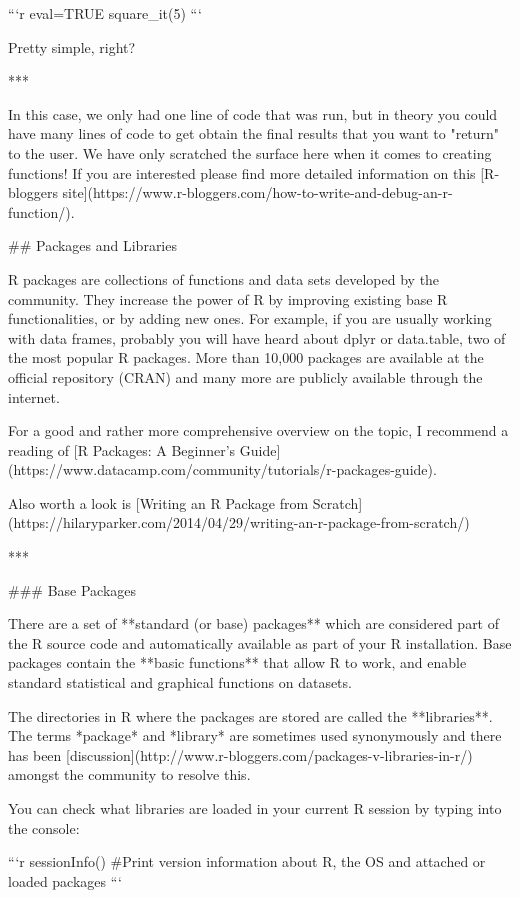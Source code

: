{{```{r eval=TRUE}
square_it(5)
```

Pretty simple, right? 

***

In this case, we only had one line of code that was run, but in theory you could have many lines of code to get obtain the final results that you want to "return" to the user. We have only scratched the surface here when it comes to creating functions! If you are interested please find more detailed information on this [R-bloggers site](https://www.r-bloggers.com/how-to-write-and-debug-an-r-function/).

## Packages and Libraries

R packages are collections of functions and data sets developed by the community. They increase the power of R by improving existing base R functionalities, or by adding new ones. For example, if you are usually working with data frames, probably you will have heard about dplyr or data.table, two of the most popular R packages. More than 10,000 packages are available at the official repository (CRAN) and many more are publicly available through the internet.

For a good and rather more comprehensive overview on the topic, I recommend a reading of [R Packages: A Beginner's Guide](https://www.datacamp.com/community/tutorials/r-packages-guide).

Also worth a look is [Writing an R Package from Scratch](https://hilaryparker.com/2014/04/29/writing-an-r-package-from-scratch/)

***

### Base Packages

There are a set of **standard (or base) packages** which are considered part of the R source code and automatically available as part of your R installation. Base packages contain the **basic functions** that allow R to work, and enable standard statistical and graphical functions on datasets.

The directories in R where the packages are stored are called the **libraries**. The terms *package* and *library* are sometimes used synonymously and there has been [discussion](http://www.r-bloggers.com/packages-v-libraries-in-r/) amongst the community to resolve this. 

You can check what libraries are loaded in your current R session by typing into the console:

```r
sessionInfo() #Print version information about R, the OS and attached or loaded packages
```

}}
